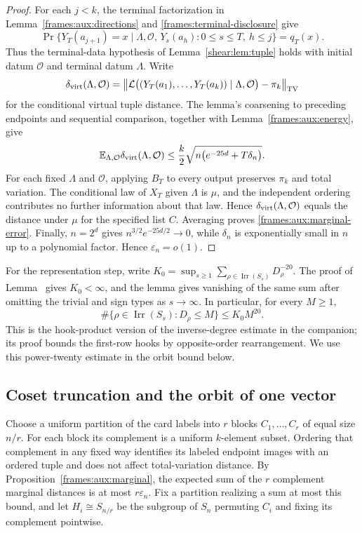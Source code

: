 \begin{proof}
For each $j<k$, the terminal factorization in
Lemma~\ref{frames:aux:directions} and
\eqref{frames:terminal-disclosure} give
\[
 \Pr\{Y_T(a_{j+1})=x\mid
       \Lambda,\mathcal O,\,
       Y_s(a_h):0\le s\le T,\ h\le j\}=q_T(x).
\]
Thus the terminal-data hypothesis of Lemma~\ref{shear:lem:tuple} holds
with initial datum $\mathcal O$ and terminal datum $\Lambda$. Write
\[
 \delta_{\rm virt}(\Lambda,\mathcal O)
 =\left\|\mathcal L\bigl((Y_T(a_1),\ldots,Y_T(a_k))
              \mid\Lambda,\mathcal O\bigr)-\pi_k\right\|_{\rm TV}
\]
for the conditional virtual tuple distance. The lemma's coarsening to
preceding endpoints and sequential comparison, together with
Lemma~\ref{frames:aux:energy}, give
\[
 \mathbb E_{\Lambda,\mathcal O}\delta_{\rm virt}(\Lambda,\mathcal O)
 \le\frac{k}{2}\sqrt{n\bigl(e^{-25d}+T\delta_n\bigr)}.
\]
For each fixed $\Lambda$ and $\mathcal O$, applying $B_T$ to every
output preserves $\pi_k$ and total variation. The conditional law of
$X_T$ given $\Lambda$ is $\mu$, and the independent ordering contributes
no further information about that law. Hence
$\delta_{\rm virt}(\Lambda,\mathcal O)$ equals the distance under
$\mu$ for the specified list $C$.
Averaging proves \eqref{frames:aux:marginal-error}. Finally, $n=2^d$ gives
$n^{3/2}e^{-25d/2}\to0$, while $\delta_n$ is exponentially small in
$n$ up to a polynomial factor.  Hence $\varepsilon_n=o(1)$.
\end{proof}

For the representation step, write
$K_0=\sup_{s\ge1}\sum_{\rho\in\operatorname{Irr}(S_s)}D_\rho^{-20}$.
The proof of Lemma~ gives $K_0<\infty$,
and the lemma gives vanishing of the same sum after omitting the trivial
and sign types as $s\to\infty$. In particular, for every $M\ge1$,
\[
 \#\{\rho\in\operatorname{Irr}(S_s):D_\rho\le M\}\le K_0M^{20}.
\]
This is the hook-product version of the inverse-degree estimate in the
companion; its proof bounds the first-row hooks by opposite-order
rearrangement. We use this power-twenty estimate in the orbit bound below.

\subsection{Coset truncation and the orbit of one vector}

Choose a uniform partition of the card labels into $r$ blocks
$C_1,\ldots,C_r$ of equal size $n/r$.  For each block its complement
is a uniform $k$-element subset.  Ordering that complement in any
fixed way identifies its labeled endpoint images with an ordered
tuple and does not affect total-variation distance.  By
Proposition~\ref{frames:aux:marginal}, the expected sum of the $r$
complement marginal distances is at most $r\varepsilon_n$.  Fix a
partition realizing a sum at most this bound, and let $H_i\cong
S_{n/r}$ be the subgroup of $S_n$ permuting $C_i$ and fixing its
complement pointwise.

